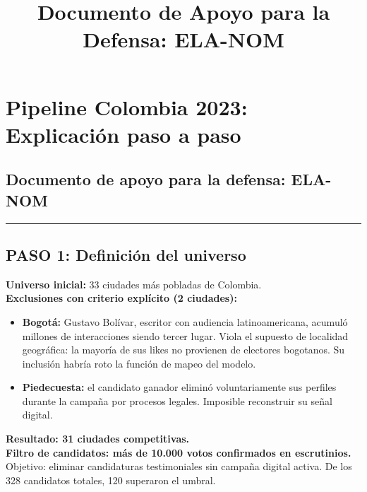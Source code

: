 \documentclass[11pt,a4paper]{article}
\title{\textbf{Documento de Apoyo para la Defensa: ELA-NOM}}
\date{}
\begin{document}
\maketitle
\tableofcontents
\newpage
\section{Pipeline Colombia 2023: Explicación paso a paso}
\subsection{Documento de apoyo para la defensa: ELA-NOM}

\vspace{4pt}\noindent\rule{\linewidth}{0.4pt}\vspace{4pt}

\subsection{PASO 1: Definición del universo}

\textbf{Universo inicial:} 33 ciudades más pobladas de Colombia.\\[2pt]

\textbf{Exclusiones con criterio explícito (2 ciudades):}\\[2pt]

\begin{itemize}[noitemsep,topsep=2pt]
\item \textbf{Bogotá:} Gustavo Bolívar, escritor con audiencia latinoamericana, acumuló millones de interacciones siendo tercer lugar. Viola el supuesto de localidad geográfica: la mayoría de sus likes no provienen de electores bogotanos. Su inclusión habría roto la función de mapeo del modelo.
\item \textbf{Piedecuesta:} el candidato ganador eliminó voluntariamente sus perfiles durante la campaña por procesos legales. Imposible reconstruir su señal digital.
\end{itemize}

\textbf{Resultado: 31 ciudades competitivas.}\\[2pt]

\textbf{Filtro de candidatos: más de 10.000 votos confirmados en escrutinios.}\\[2pt]

Objetivo: eliminar candidaturas testimoniales sin campaña digital activa. De los 328 candidatos totales, 120 superaron el umbral.\\[2pt]
\end{document}
